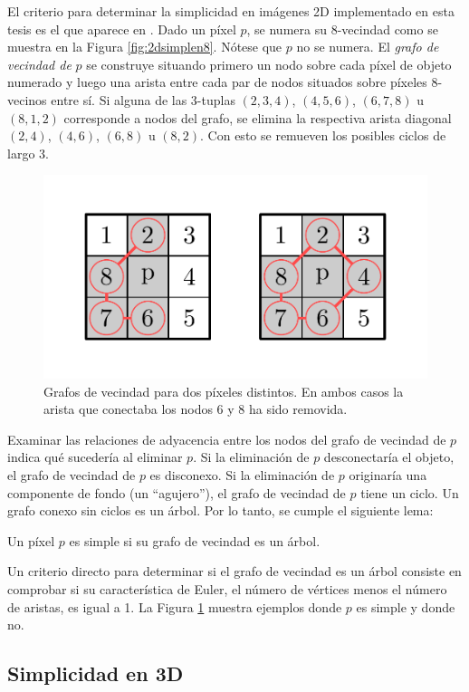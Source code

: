 El criterio para determinar la simplicidad en imágenes 2D implementado en esta tesis es el que aparece en \cite{siddiqi2002hamilton}. Dado un píxel $p$, se numera su 8-vecindad como se muestra en la Figura \ref{fig:2dsimplen8}. Nótese que $p$ no se numera. El \textit{grafo de vecindad de} $p$ se construye situando primero un nodo sobre cada píxel de objeto numerado y luego una arista entre cada par de nodos situados sobre píxeles 8-vecinos entre sí. Si alguna de las 3-tuplas $(2, 3, 4)$, $(4, 5, 6)$, $(6, 7, 8)$ u $(8, 1, 2)$ corresponde a nodos del grafo, se elimina la respectiva arista diagonal $(2, 4)$, $(4, 6)$, $(6, 8)$ u $(8, 2)$. Con esto se remueven los posibles ciclos de largo 3.

\begin{figure}[ht]\centering
\includegraphics[width=0.6\linewidth]{images/2dsimpletestgraphcases}
\caption{Grafos de vecindad para dos píxeles distintos. En ambos casos la arista que conectaba los nodos 6 y 8 ha sido removida.}
\label{fig:2dsimpleexamples}
\end{figure}

Examinar las relaciones de adyacencia entre los nodos del grafo de vecindad de $p$ indica qué sucedería al eliminar $p$. Si la eliminación de $p$ desconectaría el objeto, el grafo de vecindad de $p$ es disconexo. Si la eliminación de $p$ originaría una componente de fondo (un ``agujero''), el grafo de vecindad de $p$ tiene un ciclo. Un grafo conexo sin ciclos es un árbol. Por lo tanto, se cumple el siguiente lema:

\begin{prop}
Un píxel $p$ es simple si su grafo de vecindad es un árbol.
\end{prop}

Un criterio directo para determinar si el grafo de vecindad es un árbol consiste en comprobar si su característica de Euler, el número de vértices menos el número de aristas, es igual a 1. La Figura \ref{fig:2dsimpleexamples} muestra ejemplos donde $p$ es simple y donde no.

\subsection{Simplicidad en 3D}
\label{ssec:3Dsimplicity}

